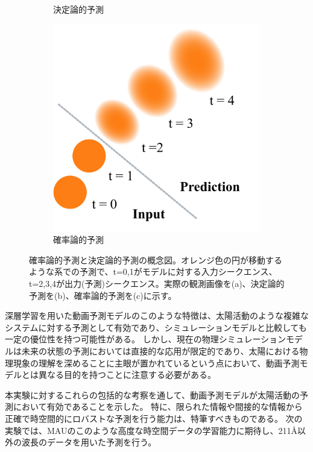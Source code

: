 \begin{figure}[htbp]
\begin{subfigure}[b]{0.3\textwidth}
          \caption{決定論的予測}
          \label{fig:pred_sample_determin}
        \end{subfigure}
        \begin{subfigure}[b]{0.3\textwidth}
          \centering
          \includegraphics[width=\textwidth]{figures/exp1/pred_sample_probaility.jpg}
          \caption{確率論的予測}
          \label{fig:pred_sample_probaility}
        \end{subfigure}
        \caption{確率論的予測と決定論的予測の概念図。オレンジ色の円が移動するような系での予測で、t=0,1がモデルに対する入力シークエンス、t=2,3,4が出力(予測)シークエンス。実際の観測画像を(a)、決定論的予測を(b)、確率論的予測を(c)に示す。}
        \label{fig:probabilistic_deterministic}
      \end{figure}

      深層学習を用いた動画予測モデルのこのような特徴は、太陽活動のような複雑なシステムに対する予測として有効であり、シミュレーションモデルと比較しても一定の優位性を持つ可能性がある。
      しかし、現在の物理シミュレーションモデルは未来の状態の予測においては直接的な応用が限定的であり、太陽における物理現象の理解を深めることに主眼が置かれているという点において、動画予測モデルとは異なる目的を持つことに注意する必要がある。
      
      本実験に対するこれらの包括的な考察を通して、動画予測モデルが太陽活動の予測において有効であることを示した。
      特に、限られた情報や間接的な情報から正確で時空間的にロバストな予測を行う能力は、特筆すべきものである。
      次の実験では、MAUのこのような高度な時空間データの学習能力に期待し、211Å以外の波長のデータを用いた予測を行う。
      

